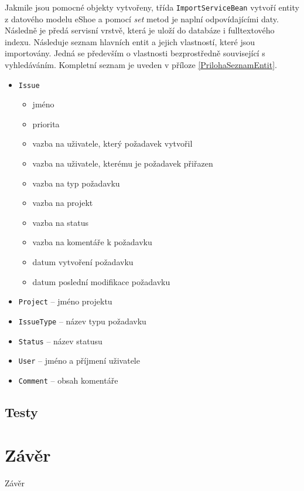 \documentclass[11pt,oneside]{fithesis2}
\begin{document}
Jakmile jsou pomocné objekty vytvořeny, třída \texttt{ImportServiceBean} vytvoří entity z datového modelu eShoe a pomocí \emph{set} metod je naplní odpovídajícími daty. Následně je předá servisní vrstvě, která je uloží do databáze i fulltextového indexu. 
Následuje seznam hlavních entit a jejich vlastností, které jsou importovány. Jedná se především o vlastnosti bezprostředně související s vyhledáváním. Kompletní seznam je uveden v příloze \ref{PrilohaSeznamEntit}.
\begin{itemize}
	\item \texttt{Issue}
		\begin{itemize}
			\item jméno
			\item priorita
			\item vazba na uživatele, který požadavek vytvořil
			\item vazba na uživatele, kterému je požadavek přiřazen
			\item vazba na typ požadavku
			\item vazba na projekt			
			\item vazba na status
			\item vazba na komentáře k požadavku
			\item datum vytvoření požadavku
			\item datum poslední modifikace požadavku
		\end{itemize}
	\item \texttt{Project} -- jméno projektu
	\item \texttt{IssueType} -- název typu požadavku
	\item \texttt{Status} -- název statusu
	\item \texttt{User} -- jméno a příjmení uživatele
	\item \texttt{Comment} -- obsah komentáře
\end{itemize}

\section{Testy}

\chapter{Závěr}
\label{ZaverChapter}
Závěr

\end{document}
